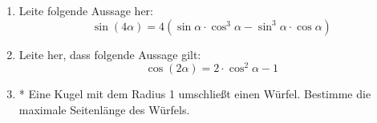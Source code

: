 \begin{enumerate}
 \item Leite folgende Aussage her: \[ \sin(4\alpha) = 4(\sin\alpha
\cdot \cos^3\alpha - \sin^3\alpha\cdot \cos\alpha)\]
 \item Leite her, dass folgende Aussage gilt:
\[\cos(2\alpha) = 2\cdot\cos^2\alpha -1 \]
 \item* Eine Kugel mit dem Radius 1 umschließt einen Würfel. Bestimme die
maximale Seitenlänge des Würfels.
\end{enumerate}


